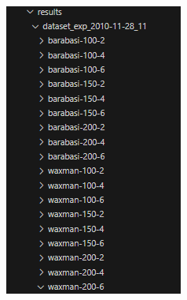 \begin{figure}[h!]
    \centering
    \begin{minipage}{0.4\textwidth}
      \centering
      \includegraphics[width=\linewidth]{img/diseno/dirpruebas2.png}
      \label{fig:dirpruebas2}
    \end{minipage}\hfill
    \begin{minipage}{0.6\textwidth}
      \centering

\end{minipage}
\end{figure}
